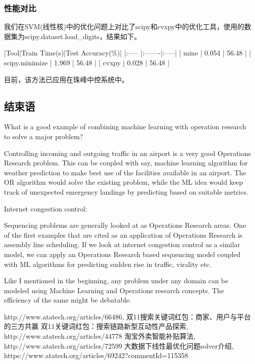 \subsubsection{性能对比}

我们在SVM(线性核)中的优化问题上对比了scipy和cvxpy中的优化工具，使用的数据集为scipy.dataset.load\_digits，结果如下。

|Tool|Train Time(s)|Test Accuracy(\%)|
|:----- |:-------|:-----|
| mine | 0.054 | 56.48 |
| scipy.minimize | 1.969 | 56.48 |
| cvxpy | 0.028 | 56.48 |

目前，该方法已应用在珠峰中控系统中。


\subsection{结束语} 
What is a good example of combining machine learning with operation research to solve a major problem? 


Controlling incoming and outgoing traffic in an airport is a very good Operations Research problem. This can be coupled with say, machine learning algorithm for weather prediction to make best use of the facilities available in an airport. The OR algorithm would solve the existing problem, while the ML idea would keep track of unexpected emergency landings by predicting based on suitable metrics.


Internet congestion control:

Sequencing problems are generally looked at as Operations Research areas. One of the first examples that are cited as an application of Operations Research is assembly line scheduling. If we look at internet congestion control as a similar model, we can apply an Operations Research based sequencing model coupled with ML algorithms for predicting sudden rise in traffic, virality etc.

Like I mentioned in the beginning, any problem under any domain can be modeled using Machine Learning and Operations research concepts. The efficiency of the same might be debatable.




\begin{thebibliography}{99}
 http://www.atatech.org/articles/66486, 双11搜索关键词红包：商家、用户与平台的三方共赢
 双11关键词红包：搜索链路新型互动性产品探索, http://www.atatech.org/articles/44778
 淘宝外卖智能补贴算法, http://www.atatech.org/articles/72599 
 大数据下线性最优化问题solver介绍, https://www.atatech.org/articles/69242?commentId=115358

\end{thebibliography}

 

